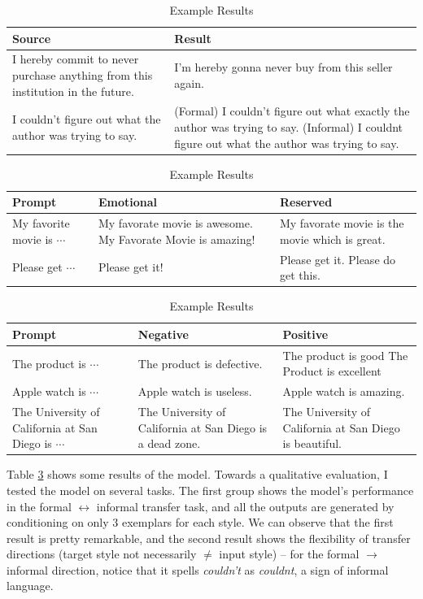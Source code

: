 \documentclass[a4paper]{article}
\begin{document}
\begin{table}[h!]
    \centering
    \label{tab:result}
    \begin{tabularx}{\linewidth}{XX}
    \midrule[1pt]
    Source  & Result \\  \midrule
     I hereby commit to never purchase anything from this institution in the future. & I'm hereby gonna never buy from this seller again.\\
     I couldn’t figure out what the author was trying to say. & (Formal) I couldn't figure out what exactly the author was trying to say. \newline (Informal) I couldnt figure out what the author was trying to say.\\\midrule[1pt]
     \end{tabularx}

    \begin{tabularx}{\linewidth}{XXX}
    \midrule[1pt]
    Prompt & Emotional & Reserved\\\midrule
    My favorite movie is $\cdots$ & My favorate movie is awesome. My Favorate Movie is amazing! & My favorate movie is the movie which is great.\\
    Please get $\cdots$ & Please get it! & Please get it. Please do get this. \\\midrule[1pt]
    \end{tabularx}

    \begin{tabularx}{\linewidth}{XXX}
        \midrule[1pt]
        Prompt & Negative & Positive \\\midrule
        The product is $\cdots$ & The product is defective. & The product is good The Product is excellent\\
        Apple watch is $\cdots$ & Apple watch is useless. & Apple watch is amazing.\\
        The University of California at San Diego is $\cdots$ & The University of California at San Diego is a dead zone. & The University of California at San Diego is beautiful.\\
        \end{tabularx}
        \caption{Example Results}
        \label{tab:result}
\end{table}

Table \ref{tab:result} shows some results of the model. Towards a qualitative evaluation, I tested the model on several tasks. The first group shows the model's performance in the formal $\leftrightarrow$ informal transfer task, and all the outputs are generated by conditioning on only 3 exemplars for each style. We can observe that the first result is pretty remarkable, and the second result shows the flexibility of transfer directions (target style not necessarily $\ne$ input style) -- for the formal $\rightarrow$ informal direction, notice that it spells \textit{couldn’t} as \textit{couldnt}, a sign of informal language.
\end{document}
